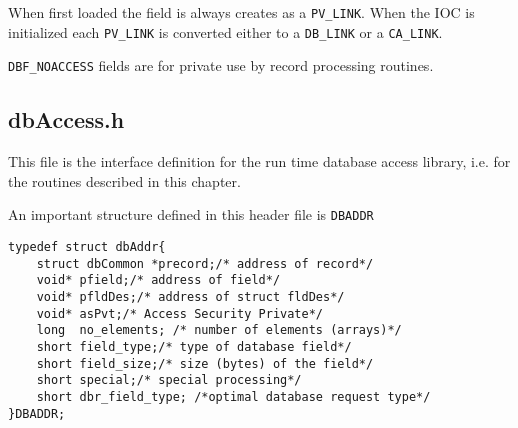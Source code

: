 When first loaded the field is always creates as a \verb|PV_LINK|.
When the IOC is initialized each \verb|PV_LINK| is converted either to a \verb|DB_LINK| or a \verb|CA_LINK|.

\verb|DBF_NOACCESS| fields are for private use by record processing routines.

\subsection{dbAccess.h}

This file is the interface definition for the run time database access library, i.e. for the routines described in this chapter.

An important structure defined in this header file is \verb|DBADDR|

\begin{verbatim}
typedef struct dbAddr{
    struct dbCommon *precord;/* address of record*/
    void* pfield;/* address of field*/
    void* pfldDes;/* address of struct fldDes*/
    void* asPvt;/* Access Security Private*/
    long  no_elements; /* number of elements (arrays)*/
    short field_type;/* type of database field*/
    short field_size;/* size (bytes) of the field*/
    short special;/* special processing*/
    short dbr_field_type; /*optimal database request type*/
}DBADDR;
\end{verbatim}
